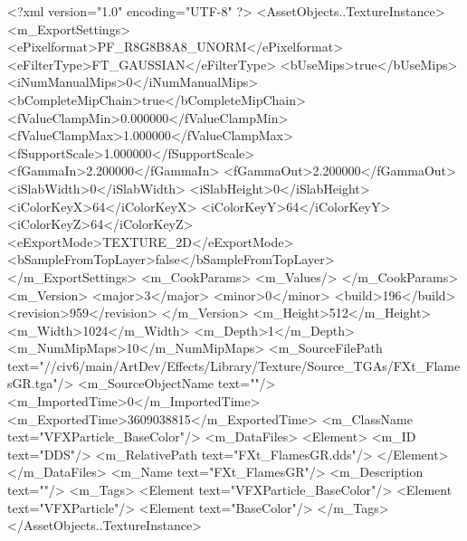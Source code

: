 <?xml version="1.0" encoding="UTF-8" ?>
<AssetObjects..TextureInstance>
	<m_ExportSettings>
		<ePixelformat>PF_R8G8B8A8_UNORM</ePixelformat>
		<eFilterType>FT_GAUSSIAN</eFilterType>
		<bUseMips>true</bUseMips>
		<iNumManualMips>0</iNumManualMips>
		<bCompleteMipChain>true</bCompleteMipChain>
		<fValueClampMin>0.000000</fValueClampMin>
		<fValueClampMax>1.000000</fValueClampMax>
		<fSupportScale>1.000000</fSupportScale>
		<fGammaIn>2.200000</fGammaIn>
		<fGammaOut>2.200000</fGammaOut>
		<iSlabWidth>0</iSlabWidth>
		<iSlabHeight>0</iSlabHeight>
		<iColorKeyX>64</iColorKeyX>
		<iColorKeyY>64</iColorKeyY>
		<iColorKeyZ>64</iColorKeyZ>
		<eExportMode>TEXTURE_2D</eExportMode>
		<bSampleFromTopLayer>false</bSampleFromTopLayer>
	</m_ExportSettings>
	<m_CookParams>
		<m_Values/>
	</m_CookParams>
	<m_Version>
		<major>3</major>
		<minor>0</minor>
		<build>196</build>
		<revision>959</revision>
	</m_Version>
	<m_Height>512</m_Height>
	<m_Width>1024</m_Width>
	<m_Depth>1</m_Depth>
	<m_NumMipMaps>10</m_NumMipMaps>
	<m_SourceFilePath text="//civ6/main/ArtDev/Effects/Library/Texture/Source_TGAs/FXt_FlamesGR.tga"/>
	<m_SourceObjectName text=""/>
	<m_ImportedTime>0</m_ImportedTime>
	<m_ExportedTime>3609038815</m_ExportedTime>
	<m_ClassName text="VFXParticle_BaseColor"/>
	<m_DataFiles>
		<Element>
			<m_ID text="DDS"/>
			<m_RelativePath text="FXt_FlamesGR.dds"/>
		</Element>
	</m_DataFiles>
	<m_Name text="FXt_FlamesGR"/>
	<m_Description text=""/>
	<m_Tags>
		<Element text="VFXParticle_BaseColor"/>
		<Element text="VFXParticle"/>
		<Element text="BaseColor"/>
	</m_Tags>
</AssetObjects..TextureInstance>

